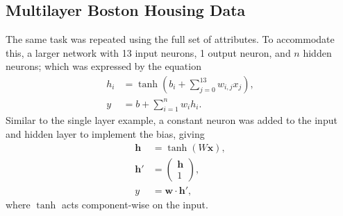 \subsection{Multilayer Boston Housing Data}

The same task was repeated using the full set of attributes.
To accommodate this, a larger network with 13 input neurons, 1 output neuron,
and $n$ hidden neurons; which was expressed by the equation
\begin{align*}
    h_i &= \tanh\left(b_i + \sum_{j=0}^{13} w_{i,j}x_j\right),\\
    y &= b + \sum_{i=1}^{n} w_i h_i.
\end{align*}
Similar to the single layer example, a constant neuron was added to the input
and hidden layer to implement the bias, giving
\begin{align*}
    \mathbf{h} &= \tanh(W\mathbf{x}),\\
    \mathbf{h}' &= \begin{pmatrix} \mathbf{h} \\ 1 \end{pmatrix},\\
    y &= \mathbf{w}\cdot\mathbf{h}',
\end{align*}
where $\tanh$ acts component-wise on the input.

